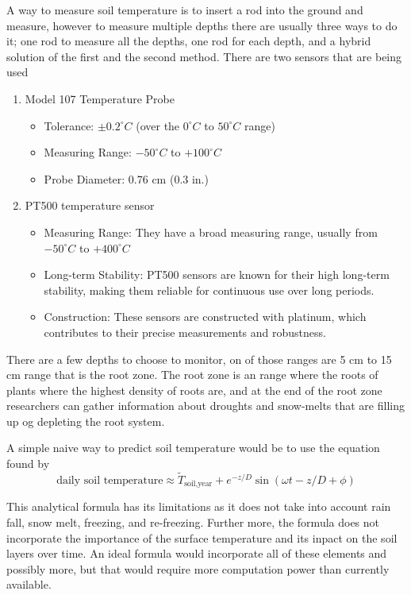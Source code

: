 A way to measure soil temperature is to insert a rod into the ground and measure, however to measure multiple depths there are usually three ways to do it; one rod to measure all the depths, one rod for each depth, and a hybrid solution of the first and the second method. There are two sensors that are being used
\begin{enumerate}
	\item Model 107 Temperature Probe\cite{noauthor_107_nodate}
	\begin{itemize}
		\item Tolerance: $\pm0.2^\circ C$ (over the $0^\circ C$ to $50^\circ C$ range)
		\item Measuring Range: $-50^\circ C$ to $+100^\circ C$
		\item Probe Diameter: 0.76 cm (0.3 in.)
	\end{itemize}
	\item PT500 temperature sensor\cite{kamstrup_dokumentasjon_nodate}
	\begin{itemize}
		\item Measuring Range: They have a broad measuring range, usually from $-50^\circ C$ to $+400^\circ C$
		\item Long-term Stability: PT500 sensors are known for their high long-term stability, making them reliable for continuous use over long periods.
		\item Construction: These sensors are constructed with platinum, which contributes to their precise measurements and robustness.
	\end{itemize}
\end{enumerate}

There are a few depths to choose to monitor, on of those ranges are 5 cm to 15 cm range that is the root zone\cite{jones_sb_35_nodate}. The root zone is an range where the roots of plants where the highest density of roots are, and at the end of the root zone researchers can gather information about droughts and snow-melts that are filling up og depleting the root system. 

A simple naive way to predict soil temperature would be to use the equation found by \cite{van_wijk_wr_periodic_1963}
\begin{equation}
	\text{daily soil temperature} \approx \widetilde{T}_{\text{soil,year}} + e^{-z/D}\sin(\omega t - z/D + \phi)
\end{equation}

This analytical formula has its limitations as it does not take into account rain fall, snow melt, freezing, and re-freezing. Further more, the formula does not incorporate the importance of the surface temperature and its inpact on the soil layers over time. An ideal formula would incorporate all of these elements and possibly more, but that would require more computation power than currently available.

